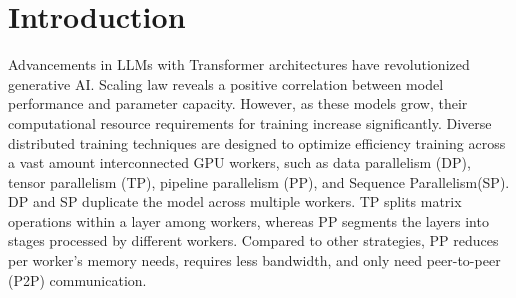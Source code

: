 \documentclass[sigplan,review,anonymous]{acmart}
\begin{document}

 


\maketitle

\section{Introduction}

Advancements in LLMs with Transformer\cite{vaswani2023attention} architectures have revolutionized generative AI. Scaling law\cite{kaplan2020scalinglawsneurallanguage} reveals a positive correlation between model performance and parameter capacity. However, as these models grow, their computational resource requirements for training increase significantly. Diverse distributed training techniques are designed to optimize efficiency training across a vast amount interconnected GPU workers, such as data parallelism (DP), tensor parallelism (TP)\cite{shoeybi2019megatron, xu2021efficient, wang2022tesseract, li2023automatedtensormodelparallelism, cheng2023atpadaptivetensorparallelism}, pipeline parallelism (PP)\cite{gems, gpipe, dapple, li2021chimera, hanayo, qi2023zerobubblepipelineparallelism}, and Sequence Parallelism(SP). DP and SP duplicate the model across multiple workers. TP splits matrix operations within a layer among workers, whereas PP segments the layers into stages processed by different workers. Compared to other strategies, PP reduces per worker's memory needs, requires less bandwidth, and only need peer-to-peer (P2P) communication.
\end{document}

